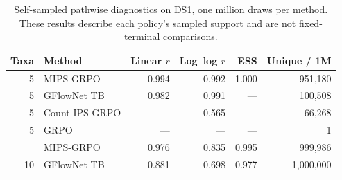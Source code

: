 \begin{table}[htbp]
\centering
\caption{Self-sampled pathwise diagnostics on DS1, one million draws per
method. These results describe each policy's sampled support and are not
fixed-terminal comparisons.}
\label{tab:phylo-diagnostic}
\begin{tabular}{rlrrrr}
\toprule
Taxa & Method & Linear \(r\) & Log--log \(r\) & ESS & Unique / 1M \\
\midrule
5 & MIPS-GRPO & 0.994 & 0.992 & 1.000 & 951,180 \\
5 & GFlowNet TB & 0.982 & 0.991 & --- & 100,508 \\
5 & Count IPS-GRPO & --- & 0.565 & --- & 66,268 \\
5 & GRPO & --- & --- & --- & 1 \\
\addlinespace
10 & MIPS-GRPO & 0.976 & 0.835 & 0.995 & 999,986 \\
10 & GFlowNet TB & 0.881 & 0.698 & 0.977 & 1,000,000 \\
\bottomrule
\end{tabular}
\end{table}
